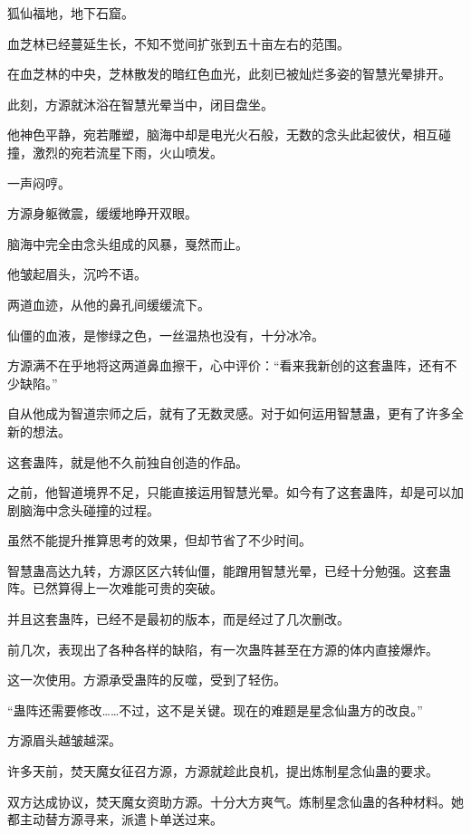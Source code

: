 
\begin{this_body}



狐仙福地，地下石窟。

血芝林已经蔓延生长，不知不觉间扩张到五十亩左右的范围。

在血芝林的中央，芝林散发的暗红色血光，此刻已被灿烂多姿的智慧光晕排开。

此刻，方源就沐浴在智慧光晕当中，闭目盘坐。

他神色平静，宛若雕塑，脑海中却是电光火石般，无数的念头此起彼伏，相互碰撞，激烈的宛若流星下雨，火山喷发。

一声闷哼。

方源身躯微震，缓缓地睁开双眼。

脑海中完全由念头组成的风暴，戛然而止。

他皱起眉头，沉吟不语。

两道血迹，从他的鼻孔间缓缓流下。

仙僵的血液，是惨绿之色，一丝温热也没有，十分冰冷。

方源满不在乎地将这两道鼻血擦干，心中评价：“看来我新创的这套蛊阵，还有不少缺陷。”

自从他成为智道宗师之后，就有了无数灵感。对于如何运用智慧蛊，更有了许多全新的想法。

这套蛊阵，就是他不久前独自创造的作品。

之前，他智道境界不足，只能直接运用智慧光晕。如今有了这套蛊阵，却是可以加剧脑海中念头碰撞的过程。

虽然不能提升推算思考的效果，但却节省了不少时间。

智慧蛊高达九转，方源区区六转仙僵，能蹭用智慧光晕，已经十分勉强。这套蛊阵。已然算得上一次难能可贵的突破。

并且这套蛊阵，已经不是最初的版本，而是经过了几次删改。

前几次，表现出了各种各样的缺陷，有一次蛊阵甚至在方源的体内直接爆炸。

这一次使用。方源承受蛊阵的反噬，受到了轻伤。

“蛊阵还需要修改……不过，这不是关键。现在的难题是星念仙蛊方的改良。”

方源眉头越皱越深。

许多天前，焚天魔女征召方源，方源就趁此良机，提出炼制星念仙蛊的要求。

双方达成协议，焚天魔女资助方源。十分大方爽气。炼制星念仙蛊的各种材料。她都主动替方源寻来，派遣卜单送过来。


\end{this_body}
